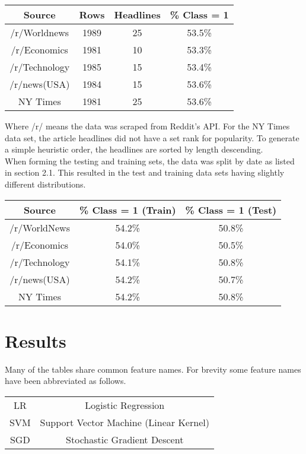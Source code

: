 \documentclass[11pt,a4paper]{article}
\begin{document}
\begin{center}
\begin{tabular}{ |c|c|c|c| }
 \hline
 Source & Rows & \small{Headlines} & \% Class = 1 \\
 \hline
 \small{/r/Worldnews} & 1989 & 25 & 53.5\% \\
 \small{/r/Economics} & 1981 & 10 & 53.3\% \\
 \small{/r/Technology} & 1985 & 15 & 53.4\% \\
 \small{/r/news(USA)} & 1984 & 15 & 53.6\% \\
 \small{ NY Times} & 1981 & 25 & 53.6\% \\
 \hline
\end{tabular}
\end{center}
Where /r/ means the data was scraped from Reddit's API. For the NY Times data set, the article headlines did not have a set rank for popularity. To generate a simple heuristic order, the headlines are sorted by length descending.\\

When forming the testing and training sets, the data was split by date as listed in section 2.1. This resulted in the test and training data sets having slightly different distributions.

\begin{center}
\begin{tabular}{ |c|c|c| }
 \hline
 Source & \% Class = 1 (Train) & \% Class = 1 (Test)\\
 \hline
 /r/WorldNews & 54.2\% & 50.8\% \\
 /r/Economics & 54.0\% & 50.5\% \\
 /r/Technology & 54.1\% & 50.8\% \\
 /r/news(USA)  & 54.2\% & 50.7\% \\
 NY Times  & 54.2\% & 50.8\%  \\
 \hline
\end{tabular}
\end{center}

\section{Results}
Many of the tables share common feature names. For brevity some feature names have been abbreviated as follows.
\begin{center}
\begin{tabular}{c c}
LR & Logistic Regression\\
SVM & Support Vector Machine (Linear Kernel)\\
SGD & Stochastic Gradient Descent
\end{tabular}
\end{center}
\end{document}
